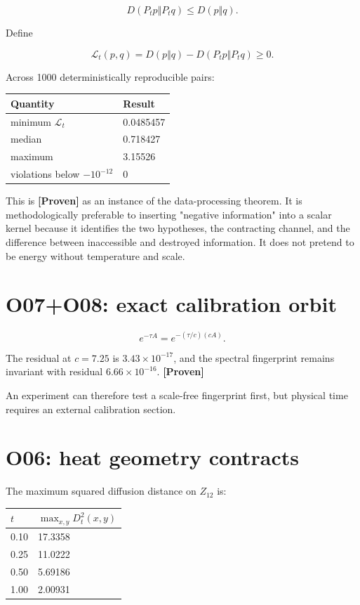\documentclass[11pt,a4paper,openany]{report}
\newcommand{\statusProven}{\textcolor{fingreen}{[Proven]}}
\begin{document}
\[
D(P_tp\Vert P_tq)\leq D(p\Vert q).
\]

Define

\[
\mathcal L_t(p,q)=D(p\Vert q)-D(P_tp\Vert P_tq)\geq0.
\]

Across 1000 deterministically reproducible pairs:

\begin{center}
\begingroup\small
\setlength{\tabcolsep}{2.5pt}
\renewcommand{\arraystretch}{1.16}
\begin{longtable}{@{}p{}p{}@{}}
\toprule
\textbf{Quantity} & \textbf{Result} \\
\midrule
\endhead
minimum \(\mathcal L_t\) & 0.0485457 \\
median & 0.718427 \\
maximum & 3.15526 \\
violations below \(-10^{-12}\) & 0 \\
\bottomrule
\end{longtable}
\endgroup
\end{center}

This is \textbf{\statusProven{}} as an instance of the data-processing theorem. It is methodologically preferable to inserting "negative information" into a scalar kernel because it identifies the two hypotheses, the contracting channel, and the difference between inaccessible and destroyed information. It does not pretend to be energy without temperature and scale.

\section{O07+O08: exact calibration orbit}

\[
e^{-\tau A}=e^{-(\tau/c)(cA)}.
\]

The residual at \(c=7.25\) is \(3.43\times10^{-17}\), and the spectral fingerprint remains invariant with residual \(6.66\times10^{-16}\). \textbf{\statusProven{}}

An experiment can therefore test a scale-free fingerprint first, but physical time requires an external calibration section.

\section{O06: heat geometry contracts}

The maximum squared diffusion distance on \(Z_{12}\) is:

\begin{center}
\begingroup\small
\setlength{\tabcolsep}{2.5pt}
\renewcommand{\arraystretch}{1.16}
\begin{longtable}{@{}p{}p{}@{}}
\toprule
\textbf{\(t\)} & \textbf{\(\max_{x,y}D_t^2(x,y)\)} \\
\midrule
\endhead
0.10 & 17.3358 \\
0.25 & 11.0222 \\
0.50 & 5.69186 \\
1.00 & 2.00931 \\
\bottomrule
\end{longtable}
\endgroup
\end{center}
\end{document}

